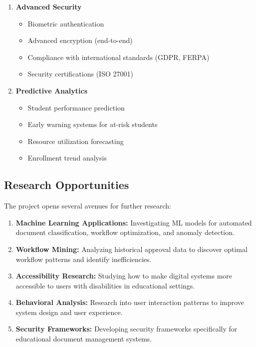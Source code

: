 \begin{enumerate}
\item \textbf{Advanced Security}
\begin{itemize}
\item Biometric authentication
\item Advanced encryption (end-to-end)
\item Compliance with international standards (GDPR, FERPA)
\item Security certifications (ISO 27001)
\end{itemize}

\item \textbf{Predictive Analytics}
\begin{itemize}
\item Student performance prediction
\item Early warning systems for at-risk students
\item Resource utilization forecasting
\item Enrollment trend analysis
\end{itemize}
\end{enumerate}

\subsection{Research Opportunities}

The project opens several avenues for further research:

\begin{enumerate}
\item \textbf{Machine Learning Applications:} Investigating ML models for automated document classification, workflow optimization, and anomaly detection.

\item \textbf{Workflow Mining:} Analyzing historical approval data to discover optimal workflow patterns and identify inefficiencies.

\item \textbf{Accessibility Research:} Studying how to make digital systems more accessible to users with disabilities in educational settings.

\item \textbf{Behavioral Analysis:} Research into user interaction patterns to improve system design and user experience.

\item \textbf{Security Frameworks:} Developing security frameworks specifically for educational document management systems.
\end{enumerate}

